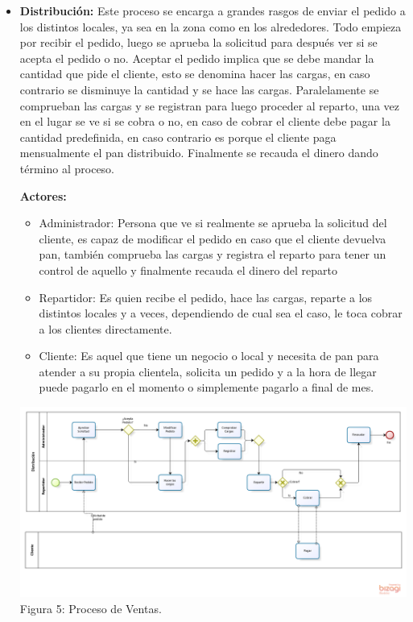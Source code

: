 \begin{itemize}
\item \textbf{Distribución:} Este proceso se encarga a grandes rasgos de enviar el pedido a los distintos locales, ya sea en la zona como en los alrededores. Todo empieza por recibir el pedido, luego se aprueba la solicitud para después ver si se acepta el pedido o no. Aceptar el pedido implica que se debe mandar la cantidad que pide el cliente, esto se denomina hacer las cargas, en caso contrario se disminuye la cantidad y se hace las cargas. Paralelamente se comprueban las cargas y se registran para luego proceder al reparto, una vez en el lugar se ve si se cobra o no, en caso de cobrar el cliente debe pagar la cantidad predefinida, en caso contrario es porque el cliente paga mensualmente el pan distribuido. Finalmente se recauda el dinero dando término al proceso.

\textbf{Actores:} 
\begin{itemize}
\item Administrador: Persona que ve si realmente se aprueba la solicitud del cliente, es capaz de modificar el pedido en caso que el cliente devuelva pan, también comprueba las cargas y registra el reparto para tener un control de aquello y finalmente recauda el dinero del reparto
\item Repartidor: Es quien recibe el pedido, hace las cargas, reparte a los distintos locales y a veces, dependiendo de cual sea el caso, le toca cobrar a los clientes directamente.
\item Cliente: Es aquel que tiene un negocio o local y necesita de pan para atender a su propia clientela, solicita un pedido y a la hora de llegar puede pagarlo en el momento o simplemente pagarlo a final de mes.
\end{itemize}

\begin{center}
\includegraphics[width=15cm]{./imagenes/Distribucion.png}\\
Figura 5: Proceso de Ventas.
\end{center}


\end{itemize}
